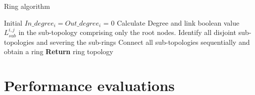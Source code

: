 \documentclass[conference]{IEEEtran}
\begin{document}
\begin{algorithm}
	\caption{Ring algorithm}
	\label{alg:ring}
	\LinesNumbered
	Initial $In\_degree_i=Out\_degree_i$ = 0\;
	Calculate Degree and link boolean value $L_{sub}^{i,j}$ in the sub-topology comprising only the root nodes.\;
	Identify all disjoint sub-topologies and severing the sub-rings\;
	Connect all sub-topologies sequentially and obtain a ring\;
	\textbf{Return} ring topology\;
\end{algorithm}

\section{Performance evaluations}
\end{document}
